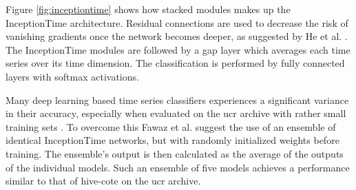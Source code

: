 Figure \ref{fig:inceptiontime} shows how stacked modules makes up the InceptionTime architecture. Residual connections are used to decrease the risk of vanishing gradients once the network becomes deeper, as suggested by He et al. \cite{He2016}. The InceptionTime modules are followed by a \gls{gap} layer which averages each time series over its time dimension. The classification is performed by fully connected layers with softmax activations.

Many deep learning based time series classifiers experiences a significant variance in their accuracy, especially when evaluated on the \gls{ucr} archive with rather small training sets \cite{IsmailFawaz2019ensemble}. To overcome this Fawaz et al. suggest the use of an ensemble of identical InceptionTime networks, but with randomly initialized weights before training. The ensemble's output is then calculated as the average of the outputs of the individual models. Such an ensemble of five models achieves a performance similar to that of \gls{hive-cote} on the \gls{ucr} archive.




